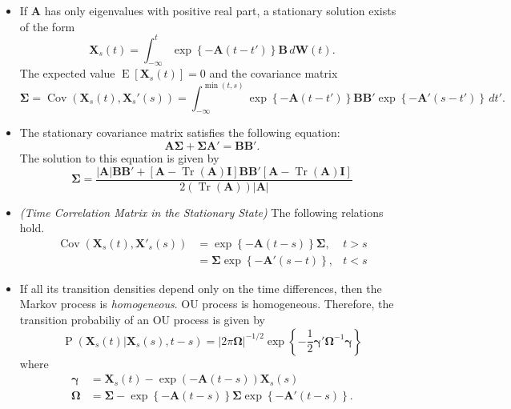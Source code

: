 \documentclass[11pt]{article}
\DeclareMathOperator{\Tr}{Tr}
\newcommand{\bs}{\boldsymbol}
\newcommand{\opn}{\operatorname}
\begin{document}
\begin{itemize}
  \item If $\bs{A}$ has only eigenvalues with positive real part, a stationary solution exists of the form
  \begin{equation}
    \bs{X}_{s}\left(t\right) = \int_{-\infty}^{t}\exp\left\{-\bs{A}\left(t-t'\right) \right\}\bs{B}\,d\bs{W}\left(t\right).
  \end{equation}
  The expected value $\opn{E}\left[\bs{X}_{s}\left(t\right)\right] = 0$ and the covariance matrix
  \begin{equation}
    \bs{\Sigma} = \opn{Cov}\left(\bs{X}_{s}\left(t\right), \bs{X}_{s}'\left(s\right)\right) = \int_{-\infty}^{\min\left(t,s\right)}\exp\left\{-\bs{A}\left(t-t'\right) \right\}\bs{BB}'\exp\left\{-\bs{A}'\left(s-t'\right) \right\}\,dt'.
  \end{equation}
  \item The stationary covariance matrix satisfies the following equation:
  \begin{equation}
    \bs{A\Sigma} + \bs{\Sigma A}' = \bs{BB}'.
  \end{equation}
  The solution to this equation is given by
  \begin{equation}
    \bs{\Sigma} = \frac{\left|\bs{A}\right|\bs{BB}' + \left[\bs{A}-\Tr\left(\bs{A}\right)\bs{I} \right]\bs{BB}'\left[\bs{A}-\Tr\left(\bs{A}\right)\bs{I}\right]}{2\left(\Tr\left(\bs{A}\right)\right)\left|\bs{A}\right|}
  \end{equation}
  \item \emph{(Time Correlation Matrix in the Stationary State)} The following relations hold.
  \begin{align}
    \opn{Cov}\left(\bs{X}_{s}\left(t\right), \bs{X}'_{s}\left(s\right)\right) &= \exp\left\{-\bs{A}\left(t-s\right) \right\}\bs{\Sigma}, & t>s \\
    &= \bs{\Sigma}\exp\left\{-\bs{A}'\left(s-t\right) \right\}, & t<s
  \end{align}
  \item If all its transition densities depend only on the time differences, then the Markov process is \emph{homogeneous}. OU process is homogeneous. Therefore, the transition probabiliy of an OU process is given by
  \begin{equation}
    \opn{P}\left(\bs{X}_{s}\left(t\right)|\bs{X}_{s}\left(s\right), t-s\right) = \left|2\pi\bs{\Omega}\right|^{-1/2}\exp\left\{-\frac{1}{2}\bs{\gamma}'\bs{\Omega}^{-1}\bs{\gamma} \right\}
  \end{equation}
  where
  \begin{align}
    \bs{\gamma} &= \bs{X}_{s}\left(t\right) -\exp\left(-\bs{A}\left(t-s\right)\right)\bs{X}_{s}\left(s\right) \\
    \bs{\Omega} &=  \bs{\Sigma} -\exp\left\{-\bs{A}\left(t-s\right) \right\}\bs{\Sigma}\exp\left\{-\bs{A}'\left(t-s\right)\right\}.
  \end{align}
\end{itemize}
\end{document}
